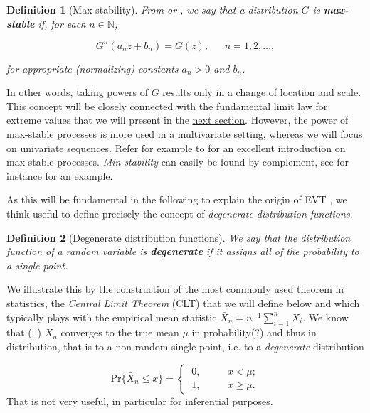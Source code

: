 \documentclass[11pt,a4paper,openany ]{book}
\newtheorem{definition}{Definition}[chapter]
\begin{document}
\begin{definition}[Max-stability] \label{maxstab}
	\emph{From \cite{leadbetter_extremes_1983} or \cite{resnick_extreme_1987}}, we say that a distribution $G$ is \emph{\textbf{max-stable}} if, for each $n\in\mathbb{N}$,
	
	
	\begin{equation}
	G^n(a_nz+b_n)=G(z), \ \ \ \ \ \ \ n= 1,2,\dots ,
	\end{equation}
	
	for appropriate (normalizing) constants $a_n>0$ and $b_n$.
\end{definition}
In other words, taking powers of $G$ results only in a change of location and scale. This concept will be closely connected with the fundamental limit law for extreme values that we will present in the \hyperref[sec:extrtypethm]{next section}.
However, the power of max-stable processes is more used in a multivariate setting, whereas we will focus on univariate sequences. Refer for example to \citet{ribatet_spatial_2015} for an excellent introduction on max-stable processes.
\emph{Min-stability} can easily be found by complement, see for instance \citet[pp.23]{ reiss_statistical_2007} for an example.


As this will be fundamental in the following to explain the origin of EVT , we think useful to define precisely the concept of \emph{degenerate distribution functions}.
\begin{definition}[Degenerate distribution functions]
	We say that the distribution function of a random variable is \emph{\textbf{degenerate}} if it assigns all of the probability to a single point.
\end{definition}

We illustrate this by the construction of the most commonly used theorem in statistics, the \emph{Central Limit Theorem} (CLT) that we will define below and which typically plays with the empirical mean statistic $\bar{X}_n=n^{-1}\sum_{i=1}^nX_i$. We know that (..) $\bar{X}_n$ converges to the true mean $\mu$ in probability(?) and thus in distribution, that is to a non-random single point, i.e. to a \emph{degenerate} distribution 

\begin{equation*}
\text{Pr}\big\{\bar{X}_n\leq x\big\}= \begin{cases}
\ 0, \ \ \ \ \ \ \ \ \ \ \ \ x<\mu; \\
\ 1, \ \ \ \  \ \ \ \ \ \ \ \ x\geq \mu. 
\end{cases}
\end{equation*}
That is not very useful, in particular for inferential purposes.
\end{document}

